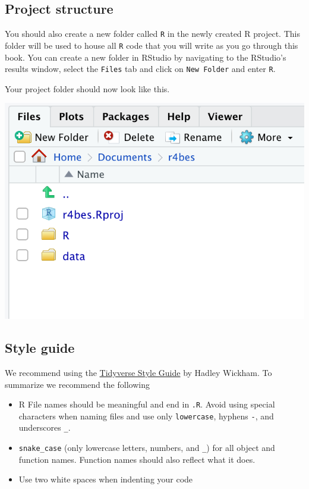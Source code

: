 \documentclass[
]{book}
\providecommand{\tightlist}{%
  \setlength{\itemsep}{0pt}\setlength{\parskip}{0pt}}
\begin{document}
\hypertarget{project-structure}{%
\subsection*{Project structure}\label{project-structure}}

You should also create a new folder called \texttt{R} in the newly created R project. This folder will be used to house all \texttt{R} code that you will write as you go through this book. You can create a new folder in RStudio by navigating to the RStudio's results window, select the \texttt{Files} tab and click on \texttt{New\ Folder} and enter \texttt{R}.

Your project folder should now look like this.

\begin{center}\includegraphics[width=0.3\linewidth]{figures/file_structure} \end{center}

\hypertarget{style-guide}{%
\subsection*{Style guide}\label{style-guide}}

We recommend using the \href{https://style.tidyverse.org/index.html}{Tidyverse Style Guide} by Hadley Wickham. To summarize we recommend the following

\begin{itemize}
\tightlist
\item
  R File names should be meaningful and end in \texttt{.R}. Avoid using special characters when naming files and use only \texttt{lowercase}, hyphens \texttt{-}, and underscores \texttt{\_}.
\item
  \texttt{snake\_case} (only lowercase letters, numbers, and \texttt{\_}) for all object and function names. Function names should also reflect what it does.
\item
  Use two white spaces when indenting your code
\end{itemize}
\end{document}
